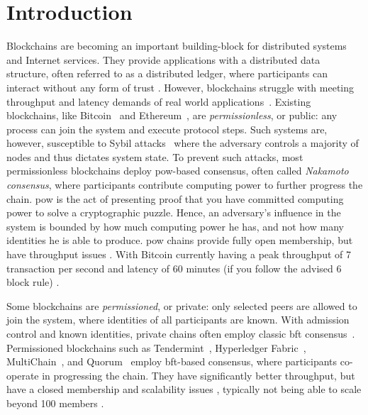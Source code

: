 \documentclass[USenglish]{uit-thesis}
\begin{document}
\mainmatter


\chapter{Introduction}\label{chap:intro}
Blockchains are becoming an important building-block for distributed systems and Internet services. 
They provide applications with a distributed data structure, often referred to as a distributed ledger, where participants can interact without any form of trust \cite{bookblock, bitcoin}.
However, blockchains struggle with meeting throughput and latency demands of real world applications~\cite{quest, teddy, teddy2}.
Existing blockchains, like Bitcoin~\cite{bitcoin} and Ethereum~\cite{ether}, are \textit{permissionless}, or public: any process can join the system and execute protocol steps. 
Such systems are, however, susceptible to Sybil attacks~\cite{sybil} where the adversary controls a majority of nodes and thus dictates system state.
To prevent such attacks, most permissionless blockchains deploy \gls{pow}-based consensus, often called \textit{Nakamoto consensus}, where participants contribute computing power to further progress the chain.
\gls{pow} is the act of presenting proof that you have committed computing power to solve a cryptographic puzzle. 
Hence, an adversary's influence in the system is bounded by how much computing power he has, and not how many identities he is able to produce.
\gls{pow} chains provide fully open membership, but have throughput issues \cite{bitcoin, quest, algorand, scaleblock, teddy, teddy2}.
With Bitcoin currently having a peak throughput of 7 transaction per second and latency of 60 minutes (if you follow the advised 6 block rule) \cite{scaleblock}.


Some blockchains are \textit{permissioned}, or private: only selected peers are allowed to join the system, where identities of all participants are known.
With admission control and known identities, private chains often employ classic \gls{bft} consensus~\cite{pbft, smr, paxos, general}. 
Permissioned blockchains such as Tendermint~\cite{tendermint}, Hyperledger Fabric~\cite{hyper}, MultiChain~\cite{multichain}, and Quorum~\cite{quor} employ \gls{bft}-based consensus, where participants co-operate in progressing the chain.
They have significantly better throughput, but have a closed membership and scalability issues \cite{quest}, typically not being able to scale beyond 100 members \cite{pbft}.
\end{document}
